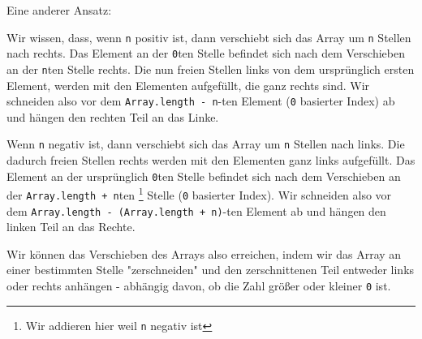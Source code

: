 \documentclass{book}
\begin{document}
Eine anderer Ansatz:

Wir wissen, dass, wenn \lstinline|n| positiv ist, dann verschiebt sich das Array um \lstinline|n| Stellen nach rechts. Das Element an der \lstinline|0|ten Stelle befindet sich nach dem Verschieben an der \lstinline|n|ten Stelle rechts. Die nun freien Stellen links von dem ursprünglich ersten Element, werden mit den Elementen aufgefüllt, die ganz rechts sind. Wir schneiden also vor dem \lstinline|Array.length - n|-ten Element (\lstinline|0| basierter Index) ab und hängen den rechten Teil an das Linke.

Wenn \lstinline|n| negativ ist, dann verschiebt sich das Array um \lstinline|n| Stellen nach links. Die dadurch freien Stellen rechts werden mit den Elementen ganz links aufgefüllt. Das Element an der ursprünglich \lstinline|0|ten Stelle befindet sich nach dem Verschieben an der \lstinline|Array.length + n|ten \footnote{Wir addieren hier weil \lstinline|n| negativ ist} Stelle (\lstinline|0| basierter Index). Wir schneiden also vor dem \lstinline|Array.length - (Array.length + n)|-ten Element ab und hängen den linken Teil an das Rechte. 

Wir können das Verschieben des Arrays also erreichen, indem wir das Array an einer bestimmten Stelle "zerschneiden" und den zerschnittenen Teil entweder links oder rechts anhängen - abhängig davon, ob die Zahl größer oder kleiner \lstinline|0| ist. 
\end{document}

